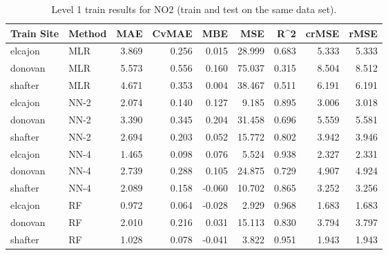 \begin{table}[h]
\begin{tabular}{llrrrrrrr}
\toprule
 Train Site & Method &   MAE &  CvMAE &       MBE &     MSE &   R\textasciicircum2 &  crMSE &   rMSE \\
\midrule
elcajon & MLR & 3.869 & 0.256 & 0.015 & 28.999 & 0.683 & 5.333 & 5.333\\
donovan & MLR & 5.573 & 0.556 & 0.160 & 75.037 & 0.315 & 8.504 & 8.512\\
shafter & MLR & 4.671 & 0.353 & 0.004 & 38.467 & 0.511 & 6.191 & 6.191\\
elcajon & NN-2 & 2.074 & 0.140 & 0.127 & 9.185 & 0.895 & 3.006 & 3.018\\
donovan & NN-2 & 3.390 & 0.345 & 0.204 & 31.458 & 0.696 & 5.559 & 5.581\\
shafter & NN-2 & 2.694 & 0.203 & 0.052 & 15.772 & 0.802 & 3.942 & 3.946\\
elcajon & NN-4 & 1.465 & 0.098 & 0.076 & 5.524 & 0.938 & 2.327 & 2.331\\
donovan & NN-4 & 2.739 & 0.288 & 0.105 & 24.875 & 0.729 & 4.907 & 4.924\\
shafter & NN-4 & 2.089 & 0.158 & -0.060 & 10.702 & 0.865 & 3.252 & 3.256\\
elcajon & RF & 0.972 & 0.064 & -0.028 & 2.929 & 0.968 & 1.683 & 1.683\\
donovan & RF & 2.010 & 0.216 & 0.031 & 15.113 & 0.830 & 3.794 & 3.797\\
shafter & RF & 1.028 & 0.078 & -0.041 & 3.822 & 0.951 & 1.943 & 1.943\\
\bottomrule
\end{tabular}
\caption{Level 1 train results for NO2 (train and test on the same data set).}
\end{table}
